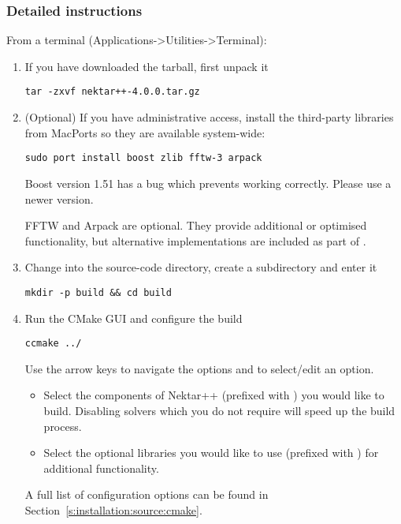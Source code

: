 \subsubsection{Detailed instructions}
From a terminal (Applications->Utilities->Terminal):
\begin{enumerate}
    \item If you have downloaded the tarball, first unpack it
    \begin{lstlisting}[style=BashInputStyle]
    tar -zxvf nektar++-4.0.0.tar.gz
    \end{lstlisting}
    
    \item (Optional) If you have administrative access, install the third-party
    libraries from MacPorts so they are available system-wide:
    \begin{lstlisting}[style=BashInputStyle]
    sudo port install boost zlib fftw-3 arpack
    \end{lstlisting}
    
    \begin{warningbox}
    Boost version 1.51 has a bug which prevents \nekpp working correctly.
    Please use a newer version.
    \end{warningbox}
    
    \begin{notebox}
    FFTW and Arpack are optional. They provide additional or optimised
    functionality, but alternative implementations are included as part of
    \nekpp.
    \end{notebox}

    \item Change into the source-code directory, create a 
    subdirectory and enter it 
    \begin{lstlisting}[style=BashInputStyle]
    mkdir -p build && cd build
    \end{lstlisting}
    
    \item Run the CMake GUI and configure the build
    \begin{lstlisting}[style=BashInputStyle]
    ccmake ../
    \end{lstlisting}
    Use the arrow keys to navigate the options and  to select/edit
    an option.
    \begin{itemize}
        \item Select the components of Nektar++ (prefixed with
        ) you would like to build. Disabling solvers
        which you do not require will speed up the build process.
        \item Select the optional libraries you would like to use (prefixed with
        ) for additional functionality.
    \end{itemize}
    A full list of configuration options can be found in
    Section~\ref{s:installation:source:cmake}.
    

\end{enumerate}
